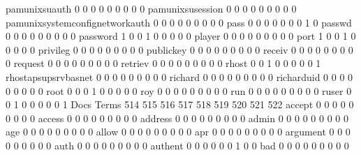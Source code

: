 \documentclass[compress,8pt]{beamer}
\begin{document}
\begin{frame}
\begin{Schunk}
  pamunixsuauth                              0   0   0   0   0   0   0   0   0
  pamunixsusession                           0   0   0   0   0   0   0   0   0
  pamunixsystemconfignetworkauth             0   0   0   0   0   0   0   0   0
  pass                                       0   0   0   0   0   0   0   1   0
  passwd                                     0   0   0   0   0   0   0   0   0
  password                                   1   0   0   1   0   0   0   0   0
  player                                     0   0   0   0   0   0   0   0   0
  port                                       1   0   0   1   0   0   0   0   0
  privileg                                   0   0   0   0   0   0   0   0   0
  publickey                                  0   0   0   0   0   0   0   0   0
  receiv                                     0   0   0   0   0   0   0   0   0
  request                                    0   0   0   0   0   0   0   0   0
  retriev                                    0   0   0   0   0   0   0   0   0
  rhost                                      0   0   1   0   0   0   0   0   1
  rhostapsupsrvbasnet                        0   0   0   0   0   0   0   0   0
  richard                                    0   0   0   0   0   0   0   0   0
  richarduid                                 0   0   0   0   0   0   0   0   0
  root                                       0   0   0   1   0   0   0   0   0
  roy                                        0   0   0   0   0   0   0   0   0
  run                                        0   0   0   0   0   0   0   0   0
  ruser                                      0   0   1   0   0   0   0   0   1
                                          Docs
Terms                                      514 515 516 517 518 519 520 521 522
  accept                                     0   0   0   0   0   0   0   0   0
  access                                     0   0   0   0   0   0   0   0   0
  address                                    0   0   0   0   0   0   0   0   0
  admin                                      0   0   0   0   0   0   0   0   0
  age                                        0   0   0   0   0   0   0   0   0
  allow                                      0   0   0   0   0   0   0   0   0
  apr                                        0   0   0   0   0   0   0   0   0
  argument                                   0   0   0   0   0   0   0   0   0
  auth                                       0   0   0   0   0   0   0   0   0
  authent                                    0   0   0   0   0   0   1   0   0
  bad                                        0   0   0   0   0   0   0   0   0

\end{Schunk}
\end{frame}
\end{document}

